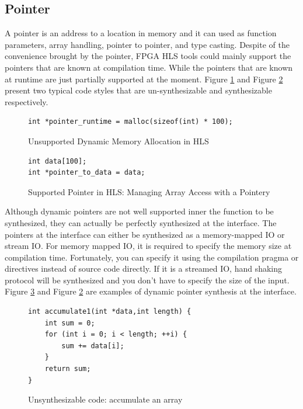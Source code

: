 \documentclass[conference]{IEEEtran}
\begin{document}
\subsection{Pointer}
\label{subsection-pointer}
A pointer is an address to a location in memory and it can used as function parameters, array handling, pointer to pointer, and type casting. Despite of the convenience brought by the pointer, FPGA HLS tools could mainly support the pointers that are known at compilation time. While the pointers that are known at runtime are just partially supported at the moment. Figure \ref{Unsupported-Dynamic-Memory} and Figure \ref{Supported-Pointer-in-HLS} present two typical code styles that are un-synthesizable and synthesizable respectively.

\begin{figure}[htb]\centering
{\fontsize{8}{8}\selectfont
\begin{lstlisting}[frame=lines]
int *pointer_runtime = malloc(sizeof(int) * 100);
\end{lstlisting}
}
\caption{Unsupported Dynamic Memory Allocation in HLS}\label{Unsupported-Dynamic-Memory}
\end{figure}

\begin{figure}[htb]\centering
{\fontsize{8}{8}\selectfont
\begin{lstlisting}[frame=lines]
int data[100];
int *pointer_to_data = data;
\end{lstlisting}
}
\caption{Supported Pointer in HLS: Managing Array Access with a Pointery}\label{Supported-Pointer-in-HLS}
\end{figure}

Although dynamic pointers are not well supported inner the function to be synthesized, they can actually be perfectly synthesized at the interface. The pointers at the interface can either be synthesized as a memory-mapped IO or stream IO. For memory mapped IO, it is required to specify the memory size at compilation time. Fortunately, you can specify it using the compilation pragma or directives instead of source code directly. If it is a streamed IO, hand shaking protocol will be synthesized and you don't have to specify the size of the input. Figure \ref{Unsynthesizable-code} and Figure \ref{Supported-Pointer-in-HLS} are examples of dynamic pointer synthesis at the interface.

\begin{figure}[htb]\centering
{\fontsize{8}{8}\selectfont
\begin{lstlisting}[frame=lines]
int accumulate1(int *data,int length) {
    int sum = 0;
    for (int i = 0; i < length; ++i) {
        sum += data[i];
    }
    return sum;
}
\end{lstlisting}
}
\caption{Unsynthesizable code: accumulate an array}\label{Unsynthesizable-code}
\end{figure}
\end{document}
